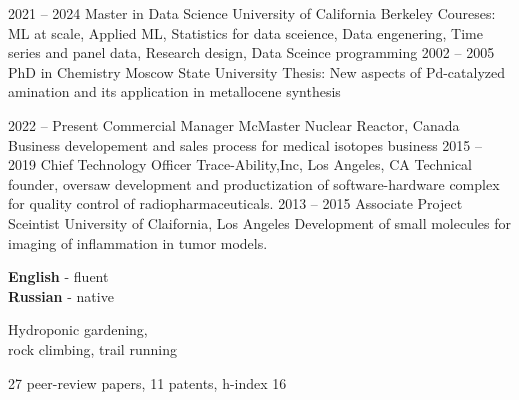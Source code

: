 \documentclass[9pt]{developercv} %
\begin{document}


\begin{entrylist}
	\entry
	{2021 -- 2024}
	{Master in Data Science}
	{University of California Berkeley}
	{Coureses: ML at scale, Applied ML, Statistics for data sceience, Data engenering, Time series and panel data, Research design, Data Sceince programming}
	\entry
	{2002 -- 2005}
	{PhD in Chemistry}
	{Moscow State University}
	{Thesis: New aspects of Pd-catalyzed amination and its application in metallocene synthesis}
\end{entrylist}
\begin{entrylist}
	\entry
		{2022 -- Present}
		{Commercial Manager}
		{McMaster Nuclear Reactor, Canada}
		{Business developement and sales process for medical isotopes business}
	\entry
		{2015 -- 2019}
		{Chief Technology Officer}
		{Trace-Ability,Inc, Los Angeles, CA}
		{Technical founder, oversaw development and productization of software-hardware complex for quality control of radiopharmaceuticals.}
	\entry
		{2013 -- 2015}
		{Associate Project Sceintist}
		{University of Claifornia, Los Angeles}
		{Development of small molecules for imaging of inflammation in tumor models.}
\end{entrylist}


\begin{minipage}[t]{0.3\textwidth}
	\vspace{-\baselineskip} %

	
	\textbf{English} - fluent\\
	\textbf{Russian} - native\\
\end{minipage}
\hfill
\begin{minipage}[t]{0.3\textwidth}
	\vspace{-\baselineskip} %
	
	
	Hydroponic gardening, \\ rock climbing, trail running
\end{minipage}
\hfill
\begin{minipage}[t]{0.3\textwidth}
	\vspace{-\baselineskip} %
	
	
	27 peer-review papers, 11 patents, h-index 16
\end{minipage}

\end{document}
